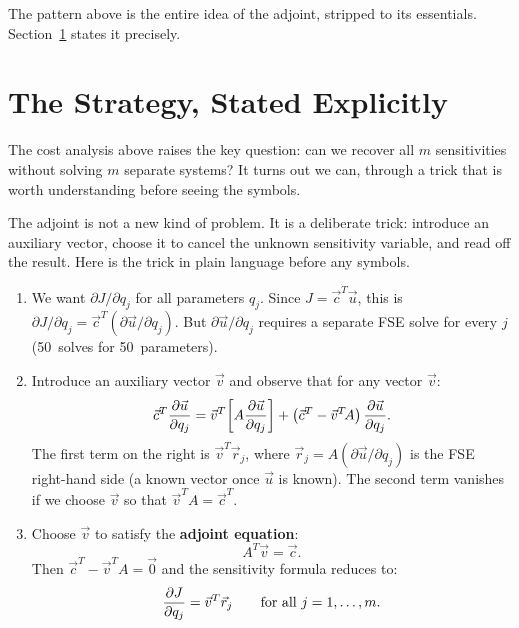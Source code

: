 \medskip

The pattern above is the entire idea of the adjoint, stripped to its
essentials. Section~\ref{sec:adjoint_strategy} states it precisely.

\section{The Strategy, Stated Explicitly}
\label{sec:adjoint_strategy}

The cost analysis above raises the key question: can we recover all $m$ sensitivities without solving $m$ separate systems?
It turns out we can, through a trick that is worth understanding before seeing the symbols.

The adjoint is not a new kind of problem. It is a deliberate trick:
introduce an auxiliary vector, choose it to cancel the unknown
sensitivity variable, and read off the result.
Here is the trick in plain language before any symbols.

\begin{enumerate}[label=\textbf{Step \arabic*.}, leftmargin=2.2cm]

\item We want $\partial J/\partial q_j$ for all parameters $q_j$.
Since $J = \vec{c}^T\vec{u}$, this is
$\partial J/\partial q_j = \vec{c}^T (\partial\vec{u}/\partial q_j)$.
But $\partial\vec{u}/\partial q_j$ requires a separate FSE solve
for every $j$ (50~solves for 50~parameters).

\item Introduce an auxiliary vector $\vec{v}$ and observe that
for any vector $\vec{v}$:
\[
  \vec{c}^T\frac{\partial \vec{u}}{\partial q_j}
  = \vec{v}^T\!\left[A\frac{\partial \vec{u}}{\partial q_j}\right]
    + \left(\vec{c}^T - \vec{v}^T\!A\right)\frac{\partial \vec{u}}{\partial q_j}.
\]
The first term on the right is $\vec{v}^T\vec{r}_j$,
where $\vec{r}_j = A(\partial\vec{u}/\partial q_j)$
is the FSE right-hand side (a known vector once $\vec{u}$ is known).
The second term vanishes if we choose $\vec{v}$ so that $\vec{v}^T A = \vec{c}^T$.

\item Choose $\vec{v}$ to satisfy the \textbf{adjoint equation}:
\begin{equation}
  A^T\vec{v} = \vec{c}.
  \label{eq:adjointeq}
\end{equation}
Then $\vec{c}^T - \vec{v}^T A = \vec{0}$ and the sensitivity formula reduces to:
\begin{equation}
  \frac{\partial J}{\partial q_j} = \vec{v}^T\vec{r}_j
  \qquad\text{for all } j = 1, \ldots, m.
  \label{eq:sensfromula}
\end{equation}
\end{enumerate}


